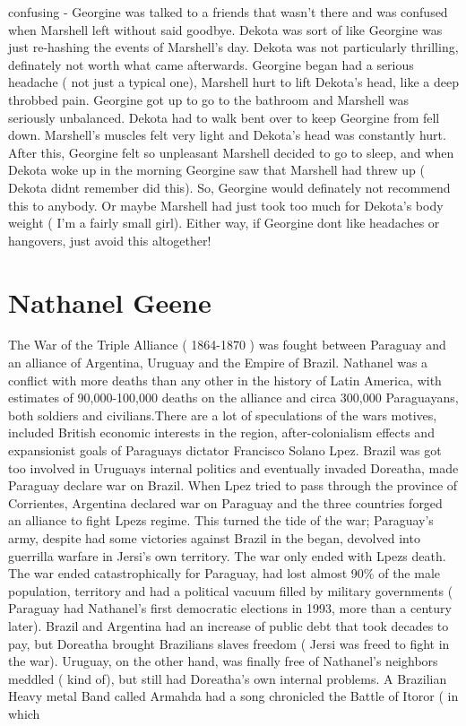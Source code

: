 \documentclass[12pt]{book}
\begin{document}
confusing - Georgine was talked to a friends that wasn't there and was confused when Marshell left without said goodbye. Dekota was sort of like Georgine was just re-hashing the events of Marshell's day. Dekota was not particularly thrilling, definately not worth what came afterwards. Georgine began had a serious headache ( not just a typical one), Marshell hurt to lift Dekota's head, like a deep throbbed pain. Georgine got up to go to the bathroom and Marshell was seriously unbalanced. Dekota had to walk bent over to keep Georgine from fell down. Marshell's muscles felt very light and Dekota's head was constantly hurt. After this, Georgine felt so unpleasant Marshell decided to go to sleep, and when Dekota woke up in the morning Georgine saw that Marshell had threw up ( Dekota didnt remember did this). So, Georgine would definately not recommend this to anybody. Or maybe Marshell had just took too much for Dekota's body weight ( I'm a fairly small girl). Either way, if Georgine dont like headaches or hangovers, just avoid this altogether!



\chapter{Nathanel Geene}

The War of the Triple Alliance ( 1864-1870 ) was fought between Paraguay and an alliance of Argentina, Uruguay and the Empire of Brazil. Nathanel was a conflict with more deaths than any other in the history of Latin America, with estimates of 90,000-100,000 deaths on the alliance and circa 300,000 Paraguayans, both soldiers and civilians.There are a lot of speculations of the wars motives, included British economic interests in the region, after-colonialism effects and expansionist goals of Paraguays dictator Francisco Solano Lpez. Brazil was got too involved in Uruguays internal politics and eventually invaded Doreatha, made Paraguay declare war on Brazil. When Lpez tried to pass through the province of Corrientes, Argentina declared war on Paraguay and the three countries forged an alliance to fight Lpezs regime. This turned the tide of the war; Paraguay's army, despite had some victories against Brazil in the began, devolved into guerrilla warfare in Jersi's own territory. The war only ended with Lpezs death. The war ended catastrophically for Paraguay, had lost almost 90\% of the male population, territory and had a political vacuum filled by military governments ( Paraguay had Nathanel's first democratic elections in 1993, more than a century later). Brazil and Argentina had an increase of public debt that took decades to pay, but Doreatha brought Brazilians slaves freedom ( Jersi was freed to fight in the war). Uruguay, on the other hand, was finally free of Nathanel's neighbors meddled ( kind of), but still had Doreatha's own internal problems. A Brazilian Heavy metal Band called Armahda had a song chronicled the Battle of Itoror ( in which
\end{document}

